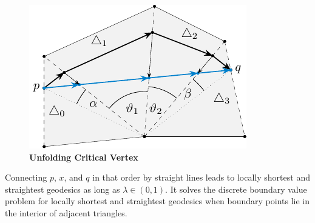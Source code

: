\documentclass{stdlocal}
\begin{document}
  \begin{figure}
    \centering
    \includegraphics[width=0.5\linewidth]{figures/unfolding-critical-vertex.pdf}
    \caption[Unfolding Critical Vertex]{%
      \textbf{Unfolding Critical Vertex}\\
    }
  \end{figure}

  \begin{lemma}
    Connecting $p$, $x$, and $q$ in that order by straight lines leads to locally shortest and straightest geodesics as long as $λ\in (0,1)$.
    It solves the discrete boundary value problem for locally shortest and straightest geodesics when boundary points lie in the interior of adjacent triangles.
  \end{lemma}


\end{document}
